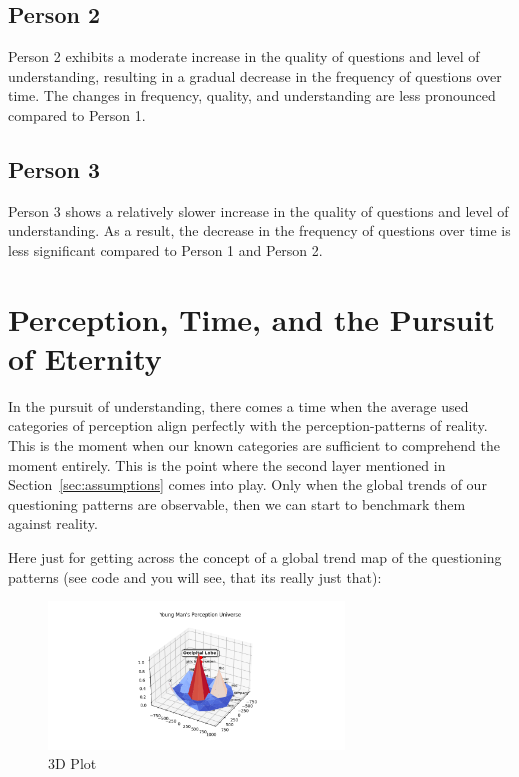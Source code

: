 \documentclass{article}
\begin{document}
    \subsection{Person 2}

    Person 2 exhibits a moderate increase in the quality of questions and level of understanding, resulting in a gradual decrease in the frequency of questions over time. The changes in frequency, quality, and understanding are less pronounced compared to Person 1.

    \subsection{Person 3}

    Person 3 shows a relatively slower increase in the quality of questions and level of understanding. As a result, the decrease in the frequency of questions over time is less significant compared to Person 1 and Person 2.


    \section{Perception, Time, and the Pursuit of Eternity}

    In the pursuit of understanding, there comes a time when the average used categories of perception align perfectly with the perception-patterns of reality. This is the moment when our known categories are sufficient to comprehend the moment entirely. This is the point where the second layer mentioned in Section~\ref{sec:assumptions} comes into play. Only when the global trends of our questioning patterns are observable, then we can start to benchmark them against reality.

    Here just for getting across the concept of a global trend map of the questioning patterns (see code and you will see, that its really just that):

    \begin{figure}[ht]
        \centering
        \includegraphics[width=0.7\textwidth]{3d_plot.png}
        \caption{3D Plot}
        \label{fig:3dplot}
    \end{figure}
\end{document}
